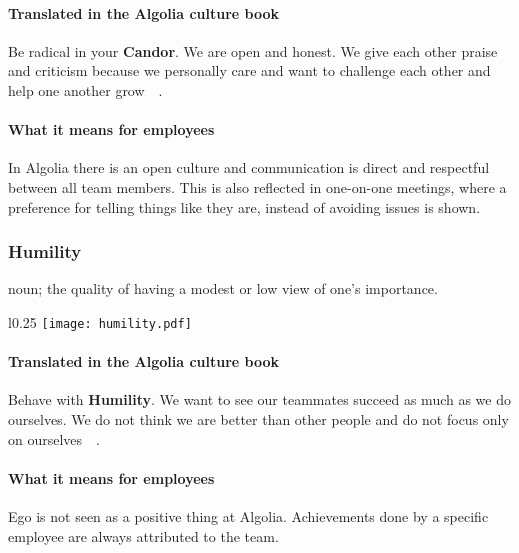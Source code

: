 \paragraph{Translated in the Algolia culture book}

Be radical in your \textbf{Candor}. We are open and honest. We give each other praise and criticism because we personally care and want to challenge each other and help one another grow~\cite{algolia-careers}~.

\paragraph{What it means for employees} 

In Algolia there is an open culture and communication is direct and respectful between all team members. This is also reflected in one-on-one meetings, where a preference for telling things like they are, instead of avoiding issues is shown.

\subsubsection{Humility}
\label{ssub:humility}

\begin{definition}
noun; the quality of having a modest or low view of one's importance.
\end{definition}

\begin{wrapfigure}{l}{0.25\textwidth}
  \centering
  \texttt{[image: humility.pdf]}
\end{wrapfigure}

\paragraph{Translated in the Algolia culture book}

Behave with \textbf{Humility}. We want to see our teammates succeed as much as we do ourselves. We do not think we are better than other people and do not focus only on ourselves~\cite{algolia-careers}~.

\paragraph{What it means for employees} 

Ego is not seen as a positive thing at Algolia. Achievements done by a specific employee are always attributed to the team.

